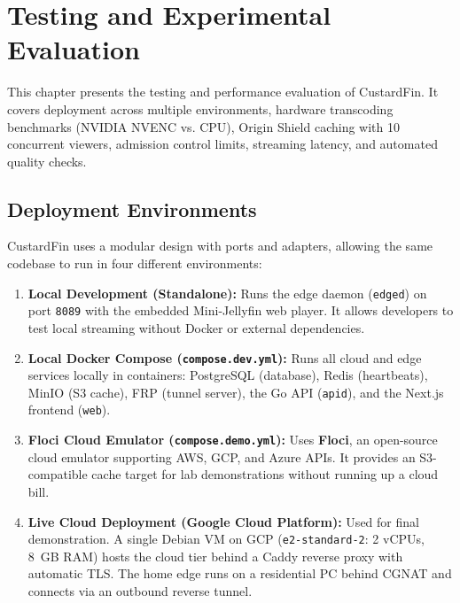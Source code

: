 
\chapter{Testing and Experimental Evaluation}
\label{chap:evaluation_testing}

This chapter presents the testing and performance evaluation of CustardFin. It covers deployment across multiple environments, hardware transcoding benchmarks (NVIDIA NVENC vs. CPU), Origin Shield caching with 10 concurrent viewers, admission control limits, streaming latency, and automated quality checks.

\section{Deployment Environments}
\label{sec:eval_topologies}

CustardFin uses a modular design with ports and adapters, allowing the same codebase to run in four different environments:

\begin{enumerate}
    \item \textbf{Local Development (Standalone):}
    Runs the edge daemon (\texttt{edged}) on port \texttt{8089} with the embedded Mini-Jellyfin web player. It allows developers to test local streaming without Docker or external dependencies.
    
    \item \textbf{Local Docker Compose (\texttt{compose.dev.yml}):}
    Runs all cloud and edge services locally in containers: PostgreSQL (database), Redis (heartbeats), MinIO (S3 cache), FRP (tunnel server), the Go API (\texttt{apid}), and the Next.js frontend (\texttt{web}).

    \item \textbf{Floci Cloud Emulator (\texttt{compose.demo.yml}):}
    Uses \textbf{Floci}, an open-source cloud emulator supporting AWS, GCP, and Azure APIs. It provides an S3-compatible cache target for lab demonstrations without running up a cloud bill.

    \item \textbf{Live Cloud Deployment (Google Cloud Platform):}
    Used for final demonstration. A single Debian VM on GCP (\texttt{e2-standard-2}: 2 vCPUs, 8~GB RAM) hosts the cloud tier behind a Caddy reverse proxy with automatic TLS. The home edge runs on a residential PC behind CGNAT and connects via an outbound reverse tunnel.
\end{enumerate}

